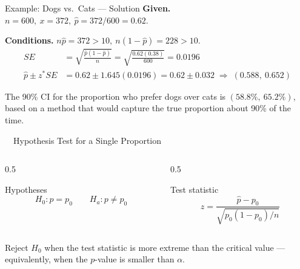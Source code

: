 \documentclass[aspectratio=169,11pt]{beamer}
\begin{document}
\begin{frame}{Example: Dogs vs.\ Cats --- Solution}
  \small
  \textbf{\color{qrnavy}Given.} $n = 600,\ x = 372,\ \hat{p} = 372/600 = 0.62$.

  \textbf{\color{qrnavy}Conditions.} $n\hat{p} = 372 > 10,\ n(1-\hat{p}) = 228 > 10.$ \checkmark
  \vspace{0.3em}
  \begin{align*}
    SE &= \sqrt{\frac{\hat{p}(1-\hat{p})}{n}} = \sqrt{\frac{0.62(0.38)}{600}} = 0.0196\\[0.3em]
    \hat{p} \pm z^{*} SE &= 0.62 \pm 1.645(0.0196) = 0.62 \pm 0.032 \;\Rightarrow\; (0.588,\ 0.652)
  \end{align*}
  \begin{tcolorbox}[colback=qrlight,colframe=qrnavy,arc=2pt,boxrule=0.6pt]
    \small The 90\% CI for the proportion who prefer dogs over cats is $(58.8\%,\ 65.2\%)$,
    based on a method that would capture the true proportion about 90\% of the time.
  \end{tcolorbox}
\end{frame}

\begin{frame}{\ \ Hypothesis Test for a Single Proportion}
  \begin{columns}[T]
    \begin{column}{0.5\textwidth}
      \begin{block}{Hypotheses}
        \[ H_0: p = p_0 \qquad H_a: p \neq p_0 \]
      \end{block}
    \end{column}
    \begin{column}{0.5\textwidth}
      \begin{block}{Test statistic}
        \[ z = \frac{\hat{p} - p_0}{\sqrt{p_0(1-p_0)/n}} \]
      \end{block}
    \end{column}
  \end{columns}
  \vspace{0.4em}
  \begin{keybox}
    Reject $H_0$ when the test statistic is more extreme than the critical value
    --- equivalently, when the $p$-value is smaller than $\alpha$.
  \end{keybox}
\end{frame}
\end{document}
